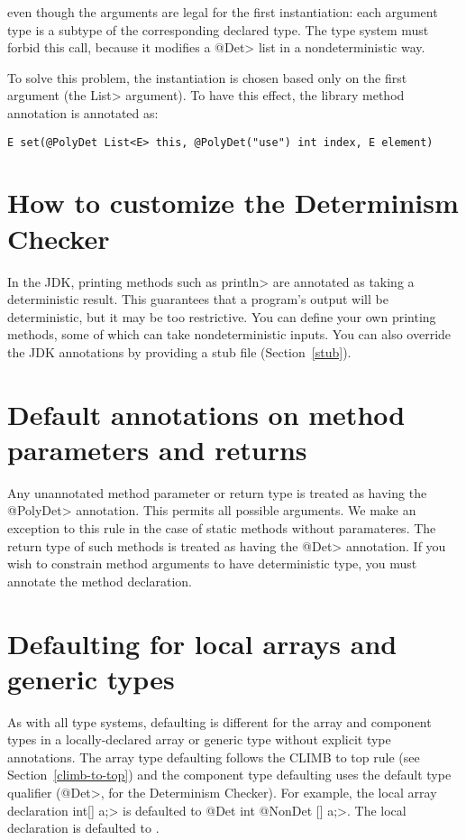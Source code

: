 \noindent
even though the arguments are legal for the first instantiation:
each argument type is a subtype of the corresponding declared type.
The type system must forbid this call, because it modifies a
\<@Det> list in a nondeterministic way.

To solve this problem, the instantiation is chosen based only on the first
argument (the \<List> argument).  To have this effect, the library method
annotation is annotated as:

\begin{Verbatim}
E set(@PolyDet List<E> this, @PolyDet("use") int index, E element)
\end{Verbatim}



\section{How to customize the Determinism Checker\label{determinism-customization}}

In the JDK, printing methods such as \<println> are annotated as taking a
deterministic result.  This guarantees that a program's output will be
deterministic, but it may be too restrictive.  You can define your own
printing methods, some of which can take nondeterministic inputs.  You can
also override the JDK annotations by providing a stub file
(Section~\ref{stub}).

\section{Default annotations on method parameters and returns\label{determinism-param-default}}

Any unannotated method parameter or return type is treated as having the
\<@PolyDet> annotation.  This permits all possible arguments. We make an exception to this
rule in the case of static methods without paramateres. The return type of such methods is treated
as having the \<@Det> annotation. If you wish
to constrain method arguments to have deterministic type, you must annotate
the method declaration.

\section{Defaulting for local arrays and generic types\label{determinism-local-arrays}}

As with all type systems, defaulting is different for the array and
component types in a locally-declared array or generic type without explicit type
annotations.
The array type defaulting follows the CLIMB to top rule (see Section~\ref{climb-to-top}) and
the component type defaulting uses the default type qualifier (\<@Det>, for
the Determinism Checker).
For example, the local array declaration \<int[] a;> is defaulted to \<@Det int @NonDet [] a;>.
The local declaration  is defaulted to
.



